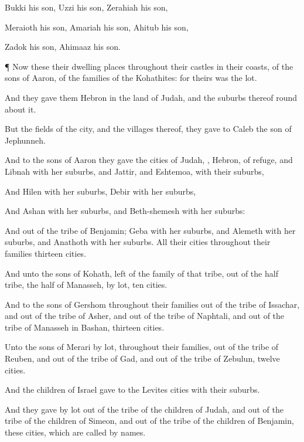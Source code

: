 {Bukki his
son,
Uzzi his
son,
Zerahiah his
son,

Meraioth his
son,
Amariah his
son,
Ahitub his
son,

Zadok his
son,
Ahimaaz his
son.


\par }{\PP {}¶ Now these
{} their dwelling
places throughout their
castles in their
coasts, of the
sons of
Aaron, of the
families of the
Kohathites: for theirs was the
lot.

And they
gave them
Hebron in the
land of
Judah, and the
suburbs thereof round
about it.

But the
fields of the
city, and the
villages thereof, they
gave to
Caleb the
son of
Jephunneh.

And to the
sons of
Aaron they
gave the
cities of Judah,
{},
Hebron,
{} of
refuge, and
Libnah with her
suburbs, and
Jattir, and
Eshtemoa, with their
suburbs,

And
Hilen with her
suburbs,
Debir with her
suburbs,

And
Ashan with her
suburbs, and
Beth-shemesh with her
suburbs:

And out of the
tribe of
Benjamin;
Geba with her
suburbs, and
Alemeth with her
suburbs, and
Anathoth with her
suburbs. All their
cities throughout their
families
{}
thirteen
cities.

And unto the
sons of
Kohath,
{}
left of the
family of that
tribe,
{} out of the
half
tribe,
{} the
half
{} of
Manasseh, by
lot,
ten
cities.

And to the
sons of
Gershom throughout their
families out of the
tribe of
Issachar, and out of the
tribe of
Asher, and out of the
tribe of
Naphtali, and out of the
tribe of
Manasseh in
Bashan,
thirteen
cities.

Unto the
sons of
Merari
{} by
lot, throughout their
families, out of the
tribe of
Reuben, and out of the
tribe of
Gad, and out of the
tribe of
Zebulun,
twelve
cities.

And the
children of
Israel
gave to the
Levites
{}
cities with their
suburbs.

And they
gave by
lot out of the
tribe of the
children of
Judah, and out of the
tribe of the
children of
Simeon, and out of the
tribe of the
children of
Benjamin, these
cities, which are
called by
{}
names.

}
